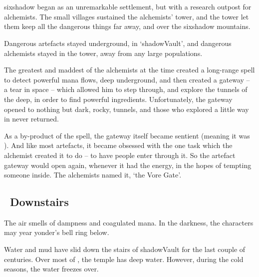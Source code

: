 \section[\glsfmttext{shadowVault}]{}
\label{shadowVault}

\begin{multicols}{2}


\begin{exampletext}
  \noindent
  \Gls{sixshadow} began as an unremarkable settlement, but with a research outpost for alchemists.
  The small \glspl{village} sustained the alchemists' tower, and the tower let them keep all the dangerous things far away, and over the \gls{sixshadow} mountains.

  Dangerous \glspl{artefact} stayed underground, in `\gls{shadowVault}', and dangerous alchemists stayed in the tower, away from any large populations.

  The greatest and maddest of the alchemists at the time created a long-range spell to detect powerful mana flows, deep underground, and then created a gateway -- a tear in space -- which allowed him to step through, and explore the tunnels of the \gls{deep}, in order to find powerful \glspl{ingredient}.
  Unfortunately, the gateway opened to nothing but dark, rocky, tunnels, and those who explored a little way in never returned.

  As a by-product of the spell, the gateway itself became sentient (meaning it was ).
  And like most \glspl{artefact}, it became obsessed with the one task which the alchemist created it to do -- to have people enter through it.
  So the \gls{artefact} gateway would open again, whenever it had the energy, in the hopes of tempting someone inside.
  The alchemists named it, `the Vore Gate'.
\end{exampletext}

\subsection[Downstairs]{~Downstairs~}

The air smells of dampness and coagulated mana.
In the darkness, the characters may year \gls{yonder}'s bell ring below.


\begin{exampletext}
  Water and mud have slid down the stairs of \gls{shadowVault} for the last couple of centuries.
  Over most of , the temple has deep water.
  However, during the cold seasons, the water freezes over.
\end{exampletext}


\end{multicols}
